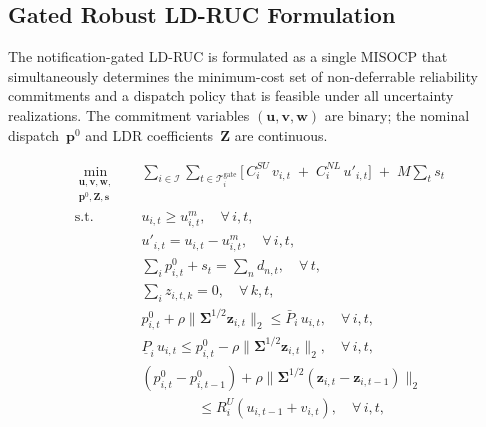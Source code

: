 \documentclass[journal]{IEEEtran}
\begin{document}
\subsection{Gated Robust LD-RUC Formulation}\label{sec:ldruc}

The notification-gated LD-RUC is formulated as a single MISOCP that
simultaneously determines the minimum-cost set of non-deferrable
reliability commitments and a dispatch policy that is feasible under
all uncertainty realizations.
The commitment variables $(\mathbf{u}, \mathbf{v}, \mathbf{w})$ are
binary; the nominal dispatch~$\mathbf{p}^0$ and LDR
coefficients~$\mathbf{Z}$ are continuous.

\begin{subequations}\label{eq:ldruc}
\begin{align}
\min_{\substack{
  \mathbf{u},\mathbf{v},\mathbf{w},\\
  \mathbf{p}^0,\mathbf{Z},\mathbf{s}}} \quad
& \sum_{i \in \mathcal{I}}
  \sum_{t \in \mathcal{T}_i^{\text{gate}}}
  \!\Big[\,
    C_i^{SU}\, v_{i,t}
    \;+\; C_i^{NL}\, u'_{i,t}
  \Big]
  \;+\; M \!\sum_{t} s_t
  \label{eq:ldruc_obj} \\[4pt]
\text{s.t.}\quad
& u_{i,t} \geq u_{i,t}^m,
  \quad \forall\, i,t,
  \label{eq:ldruc_lock} \\
& u'_{i,t} = u_{i,t} - u_{i,t}^m,
  \quad \forall\, i,t,
  \label{eq:ldruc_uprime} \\
& \sum_{i} p_{i,t}^0 + s_t = \sum_n d_{n,t},
  \quad \forall\, t,
  \label{eq:ldruc_bal_nom} \\
& \sum_{i} z_{i,t,k} = 0,
  \quad \forall\, k,t,
  \label{eq:ldruc_bal_rec} \\
& p_{i,t}^0
  + \rho \lVert \boldsymbol{\Sigma}^{1/2} \mathbf{z}_{i,t} \rVert_2
  \leq \bar{P}_i\, u_{i,t},
  \quad \forall\, i,t,
  \label{eq:ldruc_cap_up} \\
& \underline{P}_i\, u_{i,t}
  \leq p_{i,t}^0
  - \rho \lVert \boldsymbol{\Sigma}^{1/2} \mathbf{z}_{i,t} \rVert_2,
  \quad \forall\, i,t,
  \label{eq:ldruc_cap_lo} \\
& (p_{i,t}^0 - p_{i,t-1}^0)
  + \rho \lVert \boldsymbol{\Sigma}^{1/2}
    (\mathbf{z}_{i,t} - \mathbf{z}_{i,t-1}) \rVert_2
  \nonumber\\
& \qquad\qquad
  \leq R_i^U (u_{i,t-1} + v_{i,t}),
  \quad \forall\, i,t,
  \label{eq:ldruc_ramp_up} \\

\end{align}
\end{subequations}
\end{document}
